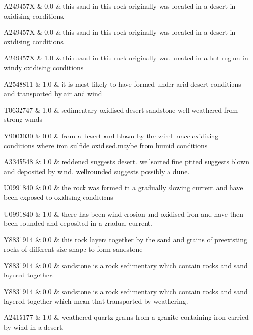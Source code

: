 A249457X & 0.0 & this sand in this rock originally was located in a desert in oxidising conditions. 
 \\ 

A249457X & 0.0 & this sand in this rock originally was located in a desert in oxidising conditions. 
 \\ 

A249457X & 1.0 & this sand in this rock originally was located in a hot region in windy oxidising conditions. 
 \\ 

A2548811 & 1.0 & it is most likely to have formed under arid desert conditions and transported by air and wind 
 \\ 

T0632747 & 1.0 & sedimentary oxidised desert sandstone well weathered from strong winds 
 \\ 

Y9003030 & 0.0 & from a desert and blown by the wind. once oxidising conditions where iron sulfide oxidised.maybe from humid conditions 
 \\ 

A3345548 & 1.0 & reddened suggests desert. wellsorted fine pitted suggests blown and deposited by wind. wellrounded suggests possibly a dune. 
 \\ 

U0991840 & 0.0 & the rock was formed in a gradually slowing current and have been exposed to oxidising conditions 
 \\ 

U0991840 & 1.0 & there has been wind erosion and oxidised iron and have then been rounded and deposited in a gradual current. 
 \\ 

Y8831914 & 0.0 & this rock layers together by the sand and grains of preexisting rocks of different size shape to form sandstone 
 \\ 

Y8831914 & 0.0 & sandstone is a rock sedimentary which contain rocks and sand layered together. 
 \\ 

Y8831914 & 0.0 & sandstone is a rock sedimentary which contain rocks and sand layered together which mean that transported by weathering. 
 \\ 

A2415177 & 1.0 & weathered quartz grains from a granite containing iron carried by wind in a desert. 
 \\ 

